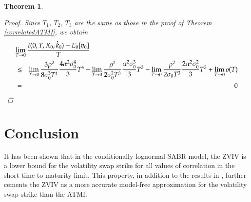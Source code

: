 \documentclass[11pt]{article}
\newtheorem{theorem}{Theorem}
\begin{document}
\begin{theorem}
\begin{proof}

Since $T_1$, $T_2$, $T_3$ are the same as those in the proof of Theorem \ref{correlatedATMI}, we obtain
\begin{eqnarray}
\lefteqn{\lim_{T\rightarrow 0}\frac{I( 0,T,X_0,\hat{k}_0) -E_{0}[v_{0}]} {T}}\nonumber \\
&\le& 
\lim_{T\rightarrow 0}\frac{3\rho^{2}}{8\sigma _{0}^{3}T^{4}} \frac{4 \alpha^2 \sigma_0^4}{3}T^4
- \lim_{T\rightarrow 0}\frac{\rho ^{2}}{{2\sigma _{0}^2T^{3}}}\frac{\alpha^2 \sigma_0^3}{3}T^3
- \lim_{T\rightarrow 0}\frac{\rho ^{2}}{2\sigma _{0}T^{3}} \frac{2 \alpha^2\sigma_0^2}{3}T^3 + \lim_{T\to 0}o(T)\nonumber\\
&=&0
\end{eqnarray}
\end{proof}
\end{theorem}


\section{Conclusion}
It has been shown that in the conditionally lognormal SABR model, the ZVIV is a lower bound for the volatility swap strike for all values of correlation in the short time to maturity limit. This property, in addition to the results in \cite{ARS}, further cements the ZVIV as a more accurate model-free approximation for the volatility swap strike than the ATMI.
\end{document}
